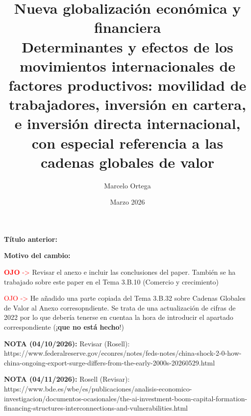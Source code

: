 \documentclass[10pt,a4paper]{article}
\title{Nueva globalización económica y financiera\\
\large Determinantes y efectos de los movimientos internacionales de factores productivos: movilidad de trabajadores, inversión en cartera, e inversión directa internacional, con especial referencia a las cadenas globales de valor}
\author{Marcelo Ortega}
\date{Marzo 2026}
\newcommand{\puntosclave}[1]{%
  \begin{tcolorbox}[
    colframe=black,
    title={Puntos clave},
    before upper={\setlength{\parindent}{0.5cm}\setlength{\parskip}{0.5\baselineskip}}
  ]
  #1
  \end{tcolorbox}
}
\newcommand{\modificaciones}[1]{
  \begin{tcolorbox}[
    colback=white,
    colframe=red,
    title={Modificaciones a realizar},
    before upper={\setlength{\parindent}{0.5cm}\setlength{\parskip}{0.5\baselineskip}}
  ]
  #1
  \end{tcolorbox}
}
\newcommand{\changebox}{%
\begin{tcolorbox}[title={Historial de cambios del tema}]
\textbf{Título anterior:} \OldTitle\par
\textbf{Motivo del cambio:} \ChangeWhy
\end{tcolorbox}
}
\newcounter{anexo}
\begin{document}
\maketitle
\changebox

\newpage

\puntosclave{ %
     
    }
\vspace{1cm}

\modificaciones{
    \textcolor{red}{\textbf{OJO} ->} Revisar el anexo e incluir las conclusiones del paper. También se ha trabajado sobre este paper en el Tema 3.B.10 (Comercio y crecimiento)

    \textcolor{red}{OJO ->} He añadido una parte copiada del Tema 3.B.32 sobre Cadenas Globales de Valor al Anexo corresopndiente. Se trata de una actualización de cifras de 2022 por lo que debería tenerse en cuentaa la hora de introducir el apartado correspondiente (¡\textbf{que no está hecho}!)

    \textbf{NOTA (04/10/2026):} Revisar (Rosell): https://www.federalreserve.gov/econres/notes/feds-notes/china-shock-2-0-how-china-ongoing-export-surge-differs-from-the-early-2000s-20260529.html

    \textbf{NOTA (04/11/2026):} Rosell (Revisar): https://www.bde.es/wbe/es/publicaciones/analisis-economico-investigacion/documentos-ocasionales/the-ai-investment-boom-capital-formation-financing-structures-interconnections-and-vulnerabilities.html

}
\end{document}
